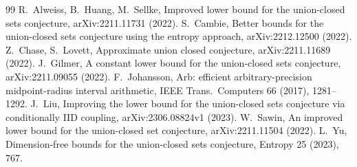 \documentclass[11pt]{article}
\theoremstyle{plain}
\theoremstyle{definition}
\theoremstyle{remark}
\begin{document}
\begin{thebibliography}{99}
 R.~Alweiss, B.~Huang, M.~Sellke, Improved lower bound for the
union-closed sets conjecture, arXiv:2211.11731 (2022).
 S.~Cambie, Better bounds for the union-closed sets conjecture
using the entropy approach, arXiv:2212.12500 (2022).
 Z.~Chase, S.~Lovett, Approximate union closed conjecture,
arXiv:2211.11689 (2022).
 J.~Gilmer, A constant lower bound for the union-closed sets
conjecture, arXiv:2211.09055 (2022).
 F.~Johansson, Arb: efficient arbitrary-precision
midpoint-radius interval arithmetic, IEEE Trans.\ Computers 66 (2017),
1281--1292.
 J.~Liu, Improving the lower bound for the union-closed sets
conjecture via conditionally IID coupling, arXiv:2306.08824v1 (2023).
 W.~Sawin, An improved lower bound for the union-closed set
conjecture, arXiv:2211.11504 (2022).
 L.~Yu, Dimension-free bounds for the union-closed sets
conjecture, Entropy 25 (2023), 767.
\end{thebibliography}
\end{document}
